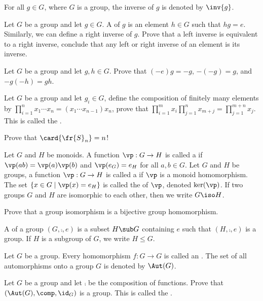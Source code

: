 \documentclass[10pt]{article}
\begin{document}
For all $g\in G$, where $G$ is a group, the inverse of $g$ is denoted by $\inv{g}$.
\begin{problem}
    Let $G$ be a group and let $g\in G$. A  of $g$ is an element $h\in G$ such that $hg=e$. Similarly, we can define a right inverse of $g$. Prove that a left inverse is equivalent to a right inverse, conclude that any left or right inverse of an element is its inverse.
\end{problem}
\begin{problem}
    Let $G$ be a group and let $g,h\in G$. Prove that $(-e)g=-g$, $-(-g)=g$, and $-g(-h)=gh$.
\end{problem}
\begin{problem}
    Let $G$ be a group and let ${g}_{i}\in G$, define the composition of finitely many elements by ${\prod}_{i=1}^{n}{x}_{1}\cdots{x}_{n}=({x}_{1}\cdots{x}_{n-1}){x}_{n}$, prove that ${\prod}_{i=1}^{m}{x}_{i}{\prod}_{j=1}^{n}{x}_{m+j}={\prod}_{j=1}^{m+n}{x}_{j}$. This is called the .
\end{problem}
\begin{problem}
    Prove that $\card{{\fr{S}}_{n}}=n$!
\end{problem}
\begin{definition}
    Let $G$ and $H$ be monoids. A function $\vp:G\to H$ is called a  if $\vp(ab)=\vp(a)\vp(b)$ and $\vp({e}_{G})={e}_{H}$ for all $a,b\in G$. Let $G$ and $H$ be groups, a function $\vp:G\to H$ is called a  if $\vp$ is a monoid homomorphism. The set $\{x\in G\mid\vp(x)={e}_{H}\}$ is called the  of $\vp$, denoted $\ker(\vp)$. If two groups $G$ and $H$ are isomorphic to each other, then we write $G\iso H$.
\end{definition}
\begin{problem}
    Prove that a group isomorphism is a bijective group homomorphism.
\end{problem}
\begin{definition}
    A  of a group $(G,\comp,e)$ is a subset $H\sub G$ containing $e$ such that $(H,\comp,e)$ is a group. If $H$ is a subgroup of $G$, we write $H\le G$.
\end{definition}
\begin{definition}
    Let $G$ be a group. Every homomorphism $f:G\to G$ is called an . The set of all automorphisms onto a group $G$ is denoted by $\Aut(G)$.
\end{definition}
\begin{problem}
    Let $G$ be a group and let $\comp$ be the composition of functions. Prove that $(\Aut(G),\comp,{\id}_{G})$ is a group. This is called the .
\end{problem}
\end{document}
